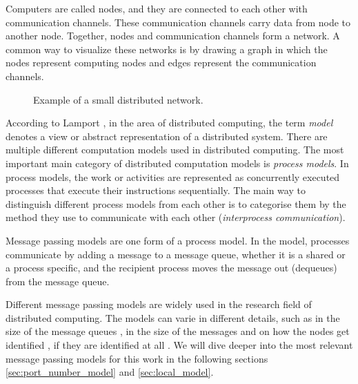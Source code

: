 Computers are called nodes, and they are connected to each other with communication channels.
These communication channels carry data from node to another node.
Together, nodes and communication channels form a network.
A common way to visualize these networks is by drawing a graph in which the nodes represent computing nodes and edges represent the communication channels.
\cite{HirvonenSuomelaDistAlg2020}

\begin{figure}[h]
  \centering
\caption{Example of a small distributed network.}
\label{fig:dist_comp_1}
\end{figure}

According to Lamport \cite{DBLP:books/el/leeuwen90/LamportL90}, in the area of distributed computing, the term \emph{model} denotes a view or abstract representation of a distributed system.
There are multiple different computation models used in distributed computing.
The most important main category of distributed computation models is \emph{process models}.
In process models, the work or activities are represented as concurrently executed processes that execute their instructions sequentially.
The main way to distinguish different process models from each other is to categorise them by the method they use to communicate with each other (\emph{interprocess communication}).
\cite{DBLP:books/el/leeuwen90/LamportL90}


Message passing models are one form of a process model.
In the model, processes communicate by adding a message to a message queue, whether it is a shared or a process specific, and the recipient process moves the message out (dequeues) from the message queue.
\cite{DBLP:books/el/leeuwen90/LamportL90}

Different message passing models are widely used in the research field of distributed computing.
The models can varie in different details, such as in the size of the message queues \cite{DBLP:books/el/leeuwen90/LamportL90}, in the size of the messages \cite{peleg2000distributed} and on how the nodes get identified \cite{DBLP:conf/focs/Linial87}, if they are identified at all \cite{DBLP:conf/istcs/MayerNS95}.
We will dive deeper into the most relevant message passing models for this work in the following sections \ref{sec:port_number_model} and \ref{sec:local_model}.

